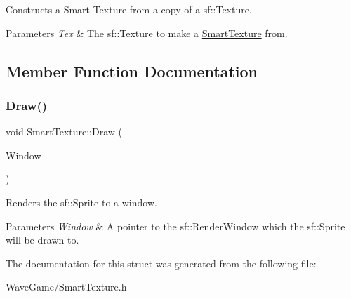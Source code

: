 Constructs a Smart Texture from a copy of a sf\+::\+Texture. 


\begin{DoxyParams}{Parameters}
{\em Tex} & The sf\+::\+Texture to make a \hyperlink{struct_smart_texture}{Smart\+Texture} from.\\
\hline
\end{DoxyParams}


\subsection{Member Function Documentation}
\mbox{\label{struct_smart_texture_ae8e39d3a1b4b325c1da2d300ba623e17}} 
\subsubsection{\texorpdfstring{Draw()}{Draw()}}
{\footnotesize\ttfamily void Smart\+Texture\+::\+Draw (\begin{DoxyParamCaption}\item[{Render\+Window $\ast$}]{Window }\end{DoxyParamCaption})\hspace{0.3cm}{\ttfamily [inline]}}



Renders the sf\+::\+Sprite to a window. 


\begin{DoxyParams}{Parameters}
{\em Window} & A pointer to the sf\+::\+Render\+Window which the sf\+::\+Sprite will be drawn to.\\
\hline
\end{DoxyParams}


The documentation for this struct was generated from the following file\+:\begin{DoxyCompactItemize}
\item 
Wave\+Game/Smart\+Texture.\+h\end{DoxyCompactItemize}
